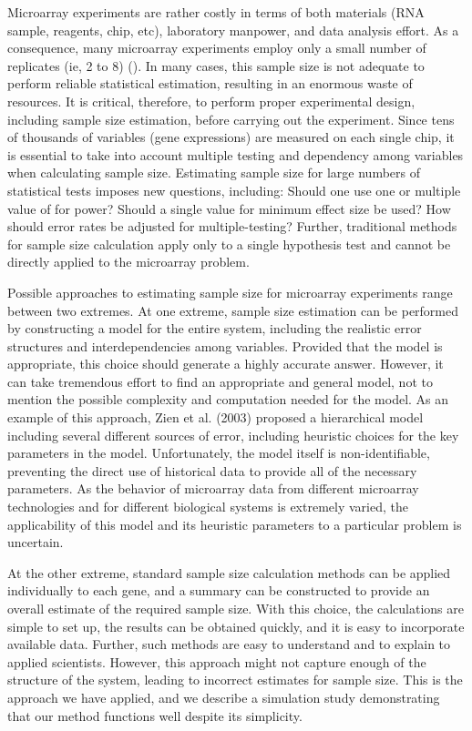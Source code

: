 \documentclass{bioinfo}
\begin{document}
Microarray experiments are rather costly in terms of both
materials (RNA sample, reagents, chip, etc), laboratory manpower,
and data analysis effort.  As a consequence, many microarray
experiments employ only a small number of replicates (ie, 2 to 8)
(\citealp{Speed03}). In many cases, this sample size is not
adequate to perform reliable statistical estimation, resulting in
an enormous waste of resources. It is critical, therefore, to
perform proper experimental design, including sample size
estimation, before carrying out the experiment. Since tens of
thousands of variables (gene expressions) are measured on each
single chip, it is essential to take into account multiple testing
and dependency among variables when calculating sample size.
Estimating sample size for large numbers of statistical tests
imposes new questions, including: Should one use one or multiple
value of for power? Should a single value for minimum effect size
be used?  How should error rates be adjusted for multiple-testing?
 Further, traditional methods for sample size calculation apply only to a single hypothesis test
and cannot be directly applied to the microarray problem.

Possible approaches to estimating sample size for microarray
experiments range between two extremes. At one extreme, sample
size estimation can be performed by constructing a model for the
entire system, including the realistic error structures and
interdependencies among variables. Provided that the model is
appropriate, this choice should generate a highly accurate answer.
However, it can take tremendous effort to find an appropriate and
general model, not to mention the possible complexity and
computation needed for the model. As an example of this approach,
Zien et al. (2003) proposed a hierarchical model including several
different sources of error, including heuristic choices for the
key parameters in the model. Unfortunately, the model itself is
non-identifiable, preventing the direct use of historical data to
provide all of the necessary parameters.  As the behavior of
microarray data from different microarray technologies and for
different biological systems is extremely varied, the
applicability of this model and its heuristic parameters to a
particular problem is uncertain.

At the other extreme, standard sample size calculation methods can
be applied individually to each gene, and a summary can be
constructed to provide an overall estimate of the required sample
size.  With this choice, the calculations are simple to set up,
the results can be obtained quickly, and it is easy to incorporate
available data. Further, such methods are easy to understand and
to explain to applied scientists.  However, this approach might
not capture enough of the structure of the system, leading to
incorrect estimates for sample size.  This is the approach we have
applied, and we describe a simulation study demonstrating that our
method functions well despite its simplicity.
\end{document}

